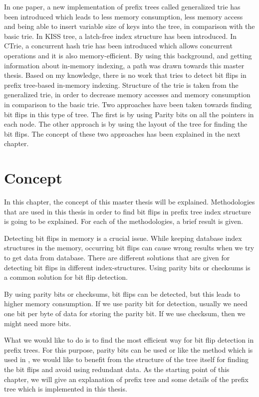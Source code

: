 \documentclass[12pt]{report}
\begin{document}
 In one paper, a new implementation of prefix trees called generalized trie has been introduced which leads to less memory consumption, less memory access and being able to insert variable size of keys into the tree, in comparison with the basic trie. In KISS tree, a latch-free index structure has been introduced. In CTrie, a concurrent hash trie has been introduced which allows concurrent operations and it is also memory-efficient. 
By using this background, and getting information about in-memory indexing, a path was drawn towards this master thesis. Based on my knowledge, there is no work that tries to detect bit flips in prefix tree-based in-memory indexing. Structure of the trie is taken from the generalized trie, in order to decrease memory accesses and memory consumption in comparison to the basic trie. Two approaches have been taken towards finding bit flips in this type of tree. The first is by using Parity bits on all the pointers in each node. The other approach is by using the layout of the tree for finding the bit flips. The concept of these two approaches has been explained in the next chapter.

\chapter{Concept}

In this chapter, the concept of this master thesis will be explained. Methodologies that are used in this thesis in order to find bit flips in prefix tree index structure is going to be explained. For each of the methodologies, a brief result is given.

Detecting bit flips in memory is a crucial issue. While keeping database index structures in the memory, occurring bit flips can cause wrong results when we try to get data from database. There are different solutions that are given for detecting bit flips in different index-structures. Using parity bits or checksums is a common solution for bit flip detection. 

By using parity bits or checksums, bit flips can be detected, but this leads to higher memory consumption. If we use parity bit for detection, usually we need one bit per byte of data for storing the parity bit. If we use checksum, then we might need more bits.

What we would like to do is to find the most efficient way for bit flip detection in prefix trees. For this purpose, parity bits can be used or like the method which is used in \cite{kolditz}, we would like to benefit from the structure of the tree itself for finding the bit flips and avoid using redundant data. As the starting point of this chapter, we will give an explanation of prefix tree and some details of the prefix tree which is implemented in this thesis.   
\end{document}
